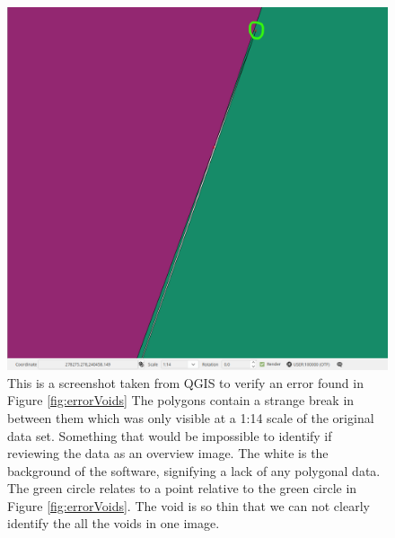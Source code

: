 \begin{figure}
\includegraphics[width=1\textwidth]{images/ch6/BoundarySplit2}
\caption{This is a screenshot taken from QGIS to verify an error found in Figure \ref{fig:errorVoids} The polygons contain a strange break in between them which was only visible at a 1:14 scale of the original data set. Something that would be impossible to identify if reviewing the data as an overview image. The white is the background of the software, signifying a lack of any polygonal data. The green circle relates to a point relative to the green circle in Figure \ref{fig:errorVoids}. The void is so thin that we can not clearly identify the all the voids in one image.} \label{fig:splitBoundary}
\end{figure}

